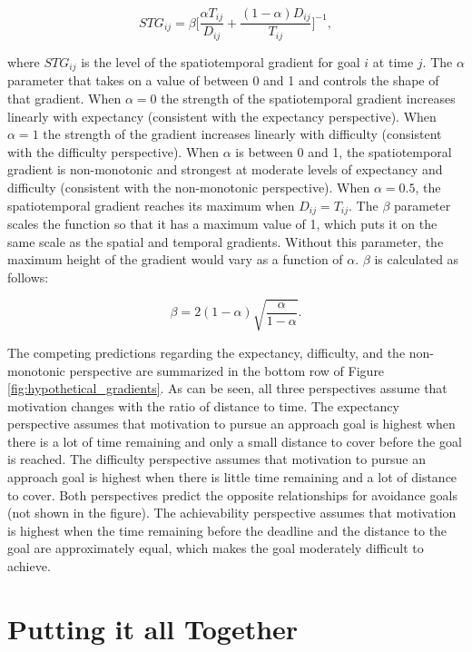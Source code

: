 \documentclass[a4paper,doc,natbib,donotrepeattitle]{apa6}
\begin{document}
\begin{equation}
STG_{ij} = \beta\Bigg[\frac{\alpha T_{ij}}{D_{ij}} + \frac{(1-\alpha) D_{ij}}{T_{ij}}\Bigg]^{-1},
\end{equation}

\noindent where $STG_{ij}$ is the level of the spatiotemporal gradient for goal $i$ at time $j$. The $\alpha$ parameter that takes on a value of between 0 and 1 and controls the shape of that gradient. When $\alpha = 0$ the strength of the spatiotemporal gradient increases linearly with expectancy (consistent with the expectancy perspective). When $\alpha = 1$ the strength of the gradient increases linearly with difficulty (consistent with the difficulty perspective). When $\alpha$ is between 0 and 1, the spatiotemporal gradient is non-monotonic and strongest at moderate levels of expectancy and difficulty (consistent with the non-monotonic perspective). When $\alpha = 0.5$, the spatiotemporal gradient reaches its maximum when $D_{ij} = T_{ij}$. The $\beta$ parameter scales the function so that it has a maximum value of 1, which puts it on the same scale as the spatial and temporal gradients. Without this parameter, the maximum height of the gradient would vary as a function of $\alpha$. $\beta$ is calculated as follows:

\begin{equation}
\beta = 2(1-\alpha) \sqrt{\frac{\alpha}{1-\alpha}} .
\end{equation}

The competing predictions regarding the expectancy, difficulty, and the non-monotonic perspective are summarized in the bottom row of Figure \ref{fig:hypothetical_gradients}. As can be seen, all three perspectives assume that motivation changes with the ratio of distance to time. The expectancy perspective assumes that motivation to pursue an approach goal is highest when there is a lot of time remaining and only a small distance to cover before the goal is reached.  The difficulty perspective assumes that motivation to pursue an approach goal is highest when there is little time remaining and a lot of distance to cover. Both perspectives predict the opposite relationships for avoidance goals (not shown in the figure). The achievability perspective assumes that motivation is highest when the time remaining before the deadline and the distance to the goal are approximately equal, which makes the goal moderately difficult to achieve.

\section{Putting it all Together}
\end{document}

